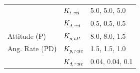 \documentclass[pdflatex,sn-basic]{sn-jnl}%
\begin{document}
\begin{appendices}
\begin{table}
{\begin{minipage}{1.3\textwidth}
\begin{minipage}{0.41\linewidth}
{\begin{tabular}{l l l}
                        & $K_{i,vel}$ & 5.0, 5.0, 5.0 \\
                        & $K_{d,vel}$ & 0.5, 0.5, 0.5 \\
                        \midrule
                        Attitude (P) & $K_{p,att}$ & 8.0, 8.0, 1.5 \\
                        \midrule
                        Ang. Rate (PD) & $K_{p,rate}$ & 1.5, 1.5, 1.0 \\
                        & $K_{d,rate}$ & 0.04, 0.04, 0.1 \\
                        \bottomrule
                    \end{tabular}%
                    }

                    \vspace{1em} %


\end{minipage}
\end{minipage}}
\end{table}
\end{appendices}
\end{document}
